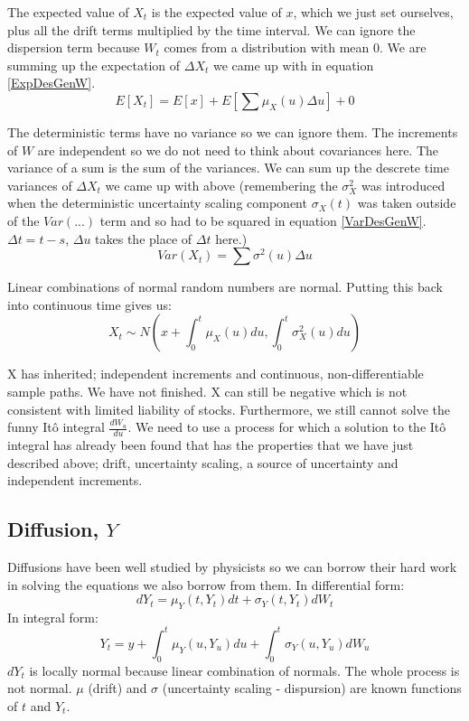 \documentclass[12pt]{article}
\begin{document}
The expected value of $X_t$ is the expected value of $x$, which we just set
ourselves, plus all the drift terms multiplied by the time interval. We can
ignore the dispersion term because $W_t$ comes from a distribution with mean 0.
We are summing up the expectation of $\Delta X_t$ we came up with in equation
\ref{ExpDesGenW}.
\begin{equation}
E[X_t]=E[x]+E \left[ \sum \mu_X(u)\Delta u\right] +0
\end{equation}

The deterministic terms have no variance so we can ignore them. The increments
of $W$ are independent so we do not need to think about covariances here. The
variance of a sum is the sum of the variances. We can sum up the descrete time
variances of $\Delta X_t$ we came up with above (remembering the $\sigma_X^2$
was introduced when the deterministic uncertainty scaling component
$\sigma_X(t)$ was taken outside of the $Var(...)$ term and so had to be
squared in equation \ref{VarDesGenW}. $\Delta t=t-s$, $\Delta u$ takes the
place of $\Delta t$ here.)
\begin{equation}
Var(X_t)=\sum \sigma^2(u)\Delta u
\end{equation}

Linear combinations of normal random numbers are normal. Putting this back
into continuous time gives us:
\begin{equation}
X_t \sim N \left( x+ \int_0^t \mu_X(u)du, \int_0^t \sigma_X^2(u)du \right)
\end{equation}

X has inherited; independent increments and continuous, non-differentiable
sample paths. We have not finished. X can still be negative which is not
consistent with limited liability of stocks. Furthermore, we still cannot solve
the funny It\^o integral $\frac{dW_u}{du}$. We need to use a process for which
a solution to the It\^o integral has already been found that has the properties
that we have just described above; drift, uncertainty scaling, a source of
uncertainty and independent increments.

\subsection{Diffusion, $Y$}
Diffusions have been well studied by physicists so we can borrow their hard
work in solving the equations we also borrow from them. In differential form:
$$dY_t=\mu_Y(t, Y_t)dt+\sigma_Y(t, Y_t)dW_t$$
In integral form:
$$Y_t=y+\int_0^t\mu_Y(u, Y_u)du+\int_0^t\sigma_Y(u,Y_u)dW_u$$
$dY_t$ is locally normal because linear combination of normals. The whole
process is not normal. $\mu$ (drift) and $\sigma$ (uncertainty scaling -
dispursion) are known functions of $t$ and $Y_t$.
\end{document}
